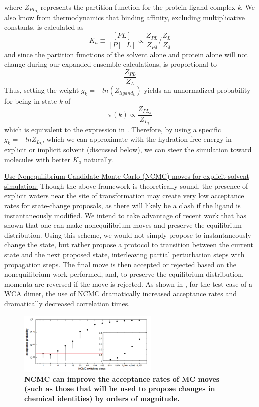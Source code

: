 \documentclass[12pt]{article}
\begin{document}
where $Z_{PL_k}$ represents the partition function for the protein-ligand complex \textit{k}.
We also know from thermodynamics that binding affinity, excluding multiplicative constants, is calculated as \cite{gilson1997}
\begin{equation} \label{eq:binding}K_a \equiv \frac{[PL]}{[P][L]} \propto \frac{Z_{PL}}{Z_{P\emptyset}} / \frac{Z_L}{Z_\emptyset} \end{equation}
%
and since the partition functions of the solvent alone and protein alone will not change during our expanded ensemble calculations,  is proportional to
%
\begin{equation} \label{eq:propbind} \frac{Z_{PL}}{Z_{L}} \end{equation}
%
Thus, setting the weight $g_k=-ln(Z_{ligand_k})$ yields an unnormalized probability for being in state \textit{k} of
%
\begin{equation} \label{eq:biasedk} \pi(k) \propto \frac{Z_{PL_k}}{Z_{L_k}} \end{equation}
%
which is equivalent to the expression in . Therefore, by using a specific $g_k = -lnZ_{L_k}$, which we can approximate with  the hydration free energy in explicit or implicit solvent (discussed below), we can steer the simulation toward molecules with better $K_{a}$ naturally.


\underline{ Use Nonequilibrium Candidate Monte Carlo (NCMC) moves for explicit-solvent simulation:} Though the above framework is theoretically sound, the presence of explicit waters near the site of transformation may create very low acceptance rates for state-change proposals, as there will likely be a clash if the ligand is instantaneously modified. We intend to take advantage of recent work \cite{nilmeier2011} that has shown that one can make nonequilibrium moves and preserve the equilibrium distribution. Using this scheme, we would not simply propose to instantaneously change the state, but rather propose a protocol to transition between the current state and the next proposed state, interleaving partial perturbation steps with propagation steps. The final move is then accepted or rejected based on the nonequilibrium work performed, and, to preserve the equilibrium distribution, momenta are reversed if the move is rejected. As shown in , for the test case of a WCA dimer, the use of NCMC dramatically increased acceptance rates and dramatically decreased correlation times.

\begin{figure}
\centering
\includegraphics[width=0.6\textwidth]{ncmc.png}
\caption{\textbf{NCMC can improve the acceptance rates of MC moves (such as those that will be used to propose changes in chemical identities) by orders of magnitude.}\cite{nilmeier2011}}
\label{ncmcfig}
\end{figure}
\end{document}
